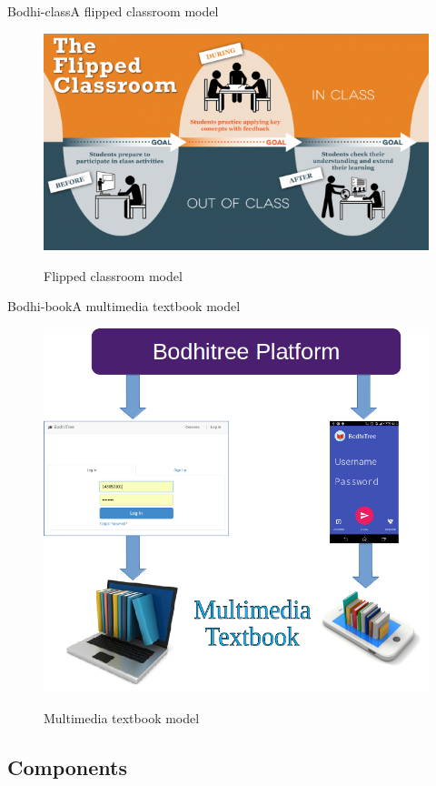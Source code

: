 \documentclass[xcolor=table]{beamer}
\begin{document}
\begin{frame}{Bodhi-class}{A flipped classroom model}
	\begin{figure}
	\centering
	\includegraphics[width=0.8\linewidth]{./media/flippedflowmodel}\\[-1ex]
	\caption{Flipped classroom model}
	\label{fig:btclass}
	\end{figure}
\end{frame}

\begin{frame}{Bodhi-book}{A multimedia textbook model}
	\begin{figure}
	\centering
	\includegraphics[width=0.5\linewidth]{./media/bmmt}\\[-1ex]
	\caption{Multimedia textbook model}
	\label{fig:btmmb}
	\end{figure}
\end{frame}

\subsection{Components}
\end{document}
